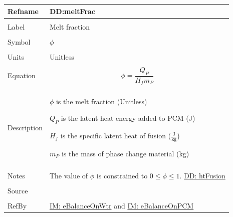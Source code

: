 \documentclass[12pt]{article}
\begin{document}
\noindent \begin{minipage}{\textwidth}
\begin{tabular}{>{\raggedright}p{}>{\raggedright\arraybackslash}p{}}
\toprule \textbf{Refname} & \textbf{DD:meltFrac}
\label{DD:meltFrac}
\\ \midrule \\
Label & Melt fraction
\\ \midrule \\
Symbol & $ϕ$
\\ \midrule \\
Units & Unitless
\\ \midrule \\
Equation & \begin{displaymath}
           ϕ=\frac{{Q_{P}}}{{H_{f}} {m_{P}}}
           \end{displaymath}
\\ \midrule \\
Description & \begin{symbDescription}
              \item{$ϕ$ is the melt fraction (Unitless)}
              \item{${Q_{P}}$ is the latent heat energy added to PCM (J)}
              \item{${H_{f}}$ is the specific latent heat of fusion ($\frac{\text{J}}{\text{kg}}$)}
              \item{${m_{P}}$ is the mass of phase change material (kg)}
              \end{symbDescription}
\\ \midrule \\
Notes & The value of $ϕ$ is constrained to $0\leq{}ϕ\leq{}1$.
        \hyperref[DD:htFusion]{DD: htFusion}
\\ \midrule \\
Source & \cite{koothoor2013}
\\ \midrule \\
RefBy & \hyperref[IM:eBalanceOnWtr]{IM: eBalanceOnWtr} and \hyperref[IM:eBalanceOnPCM]{IM: eBalanceOnPCM}
\\ \bottomrule
\end{tabular}
\end{minipage}
\end{document}
